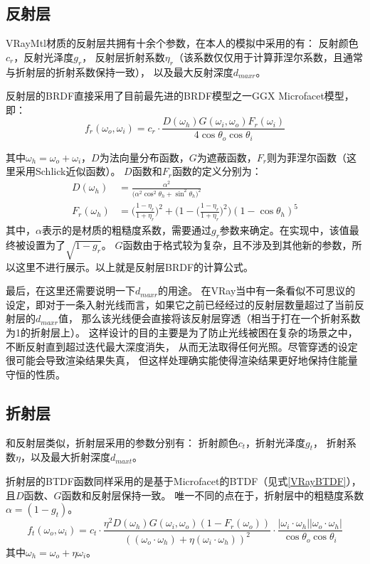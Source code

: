 \subsection{反射层}

VRayMtl材质的反射层共拥有十余个参数，在本人的模拟中采用的有：
反射颜色$c_{r}$，反射光泽度$g_r$，
反射层折射系数$\eta_{r}$（该系数仅仅用于计算菲涅尔系数，且通常与折射层的折射系数保持一致），
以及最大反射深度$d_{maxr}$。

反射层的BRDF直接采用了目前最先进的BRDF模型之一GGX Microfacet模型\cite{Walter2007MicrofacetMF}\cite{GTR}，即：
\begin{equation}
f_r(\omega_o, \omega_i) = c_r \cdot \frac{D(\omega_h)G(\omega_i,\omega_o)F_r(\omega_i)}{4\cos\theta_o\cos\theta_i} 
\end{equation}

其中$\omega_h=\omega_o+\omega_i$，$D$为法向量分布函数，$G$为遮蔽函数，$F_r$则为菲涅尔函数（这里采用Schlick近似函数）。
$D$函数和$F_r$函数的定义分别为：
\begin{align}
D(\omega_h) &= \frac{\alpha^2}{\Big(\alpha^2\cos^2\theta_h + \sin^2\theta_h\Big)^2}\\
F_r(\omega_h) &= \Big(\frac{1-\eta_r}{1+\eta_r}\Big)^2+\Big(1-\Big(\frac{1-\eta_r}{1+\eta_r}\Big)^2\Big)(1-\cos\theta_h)^5
\end{align}
其中，$\alpha$表示的是材质的粗糙度系数，需要通过$g_r$参数来确定。在实现中，该值最终被设置为了$\sqrt{1-g_r}$。
$G$函数由于格式较为复杂，且不涉及到其他新的参数，所以这里不进行展示。以上就是反射层BRDF的计算公式。

最后，在这里还需要说明一下$d_{maxr}$的用途。
在VRay当中有一条看似不可思议的设定，即对于一条入射光线而言，如果它之前已经经过的反射层数量超过了当前反射层的$d_{maxr}$值，
那么该光线便会直接将该反射层穿透（相当于打在一个折射系数为1的折射层上）。
这样设计的目的主要是为了防止光线被困在复杂的场景之中，不断反射直到超过迭代最大深度消失，
从而无法取得任何光照。尽管穿透的设定很可能会导致渲染结果失真，
但这样处理确实能使得渲染结果更好地保持住能量守恒的性质。

\subsection{折射层}

和反射层类似，折射层采用的参数分别有：
折射颜色$c_t$，折射光泽度$g_t$，
折射系数$\eta$，以及最大折射深度$d_{maxt}$。

折射层的BTDF函数同样采用的是基于Microfacet的BTDF\cite{Walter2007MicrofacetMF}（见式\ref{VRayBTDF}），且$D$函数、$G$函数和反射层保持一致。
唯一不同的点在于，折射层中的粗糙度系数$\alpha=(1-g_t)$。
\begin{equation}
    \label{VRayBTDF}
    f_t(\omega_o, \omega_i) = c_t \cdot \frac{\eta^2 D(\omega_h)G(\omega_i,\omega_o)(1-F_r(\omega_o))}{((\omega_o\cdot\omega_h) + \eta (\omega_i\cdot\omega_h))^2}\cdot \frac{|\omega_i\cdot\omega_h||\omega_o\cdot\omega_h|}{\cos\theta_o\cos\theta_i} 
\end{equation}
其中$\omega_h=\omega_o+\eta\omega_i$。

